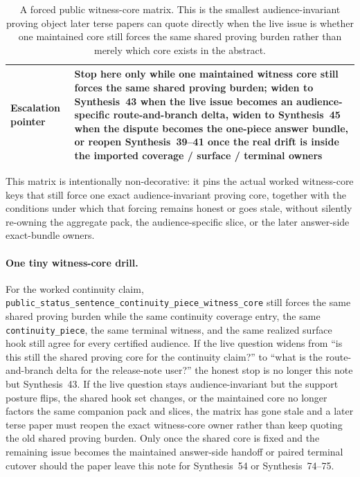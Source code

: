 \documentclass[11pt]{article}
\begin{document}
\begin{table}[t]
\begin{tabularx}{\linewidth}{@{}lX@{}}
Escalation pointer & Stop here only while one maintained witness core still forces the same shared proving burden; widen to Synthesis~43 when the live issue becomes an audience-specific route-and-branch delta, widen to Synthesis~45 when the dispute becomes the one-piece answer bundle, or reopen Synthesis~39--41 once the real drift is inside the imported coverage / surface / terminal owners \\
\bottomrule
\end{tabularx}
\caption{A forced public witness-core matrix. This is the smallest audience-invariant proving object later terse papers can quote directly when the live issue is whether one maintained core still forces the same shared proving burden rather than merely which core exists in the abstract.}
\label{tab:forced-public-witness-core-matrix}
\end{table}

This matrix is intentionally non-decorative: it pins the actual worked witness-core keys that still force one exact audience-invariant proving core, together with the conditions under which that forcing remains honest or goes stale, without silently re-owning the aggregate pack, the audience-specific slice, or the later answer-side exact-bundle owners.\cite{series:workedexample}

\paragraph{One tiny witness-core drill.}
For the worked continuity claim, \nolinkurl{public_status_sentence_continuity_piece_witness_core} still forces the same shared proving burden while the same continuity coverage entry, the same \nolinkurl{continuity_piece}, the same terminal witness, and the same realized surface hook still agree for every certified audience. If the live question widens from ``is this still the shared proving core for the continuity claim?'' to ``what is the route-and-branch delta for the release-note user?'' the honest stop is no longer this note but Synthesis~43. If the live question stays audience-invariant but the support posture flips, the shared hook set changes, or the maintained core no longer factors the same companion pack and slices, the matrix has gone stale and a later terse paper must reopen the exact witness-core owner rather than keep quoting the old shared proving burden. Only once the shared core is fixed and the remaining issue becomes the maintained answer-side handoff or paired terminal cutover should the paper leave this note for Synthesis~54 or Synthesis~74--75.\cite{series:workedexample}
\end{document}

